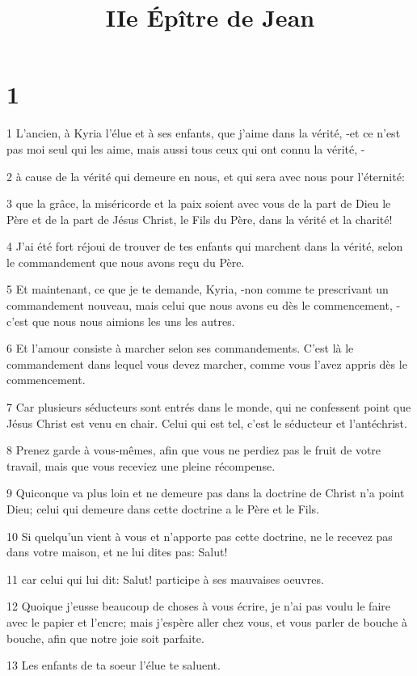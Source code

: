 

\title{IIe Épître de Jean}


\chapter{1}

\par 1 L'ancien, à Kyria l'élue et à ses enfants, que j'aime dans la vérité, -et ce n'est pas moi seul qui les aime, mais aussi tous ceux qui ont connu la vérité, -
\par 2 à cause de la vérité qui demeure en nous, et qui sera avec nous pour l'éternité:
\par 3 que la grâce, la miséricorde et la paix soient avec vous de la part de Dieu le Père et de la part de Jésus Christ, le Fils du Père, dans la vérité et la charité!
\par 4 J'ai été fort réjoui de trouver de tes enfants qui marchent dans la vérité, selon le commandement que nous avons reçu du Père.
\par 5 Et maintenant, ce que je te demande, Kyria, -non comme te prescrivant un commandement nouveau, mais celui que nous avons eu dès le commencement, -c'est que nous nous aimions les uns les autres.
\par 6 Et l'amour consiste à marcher selon ses commandements. C'est là le commandement dans lequel vous devez marcher, comme vous l'avez appris dès le commencement.
\par 7 Car plusieurs séducteurs sont entrés dans le monde, qui ne confessent point que Jésus Christ est venu en chair. Celui qui est tel, c'est le séducteur et l'antéchrist.
\par 8 Prenez garde à vous-mêmes, afin que vous ne perdiez pas le fruit de votre travail, mais que vous receviez une pleine récompense.
\par 9 Quiconque va plus loin et ne demeure pas dans la doctrine de Christ n'a point Dieu; celui qui demeure dans cette doctrine a le Père et le Fils.
\par 10 Si quelqu'un vient à vous et n'apporte pas cette doctrine, ne le recevez pas dans votre maison, et ne lui dites pas: Salut!
\par 11 car celui qui lui dit: Salut! participe à ses mauvaises oeuvres.
\par 12 Quoique j'eusse beaucoup de choses à vous écrire, je n'ai pas voulu le faire avec le papier et l'encre; mais j'espère aller chez vous, et vous parler de bouche à bouche, afin que notre joie soit parfaite.
\par 13 Les enfants de ta soeur l'élue te saluent.


